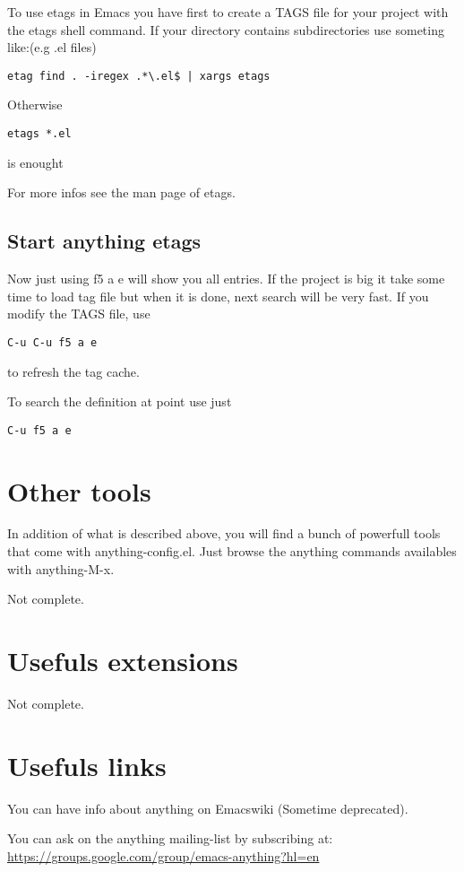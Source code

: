 \documentclass[a4paper,11pt]{article}
\begin{document}
To use etags in Emacs you have first to create a TAGS file for your project with the etags shell command.
If your directory contains subdirectories use someting like:(e.g .el files)
\begin{verbatim}
etag find . -iregex .*\.el$ | xargs etags
\end{verbatim}
Otherwise
\begin{verbatim}
etags *.el
\end{verbatim}
is enought

For more infos see the man page of etags.

\subsection{Start anything etags}
\label{sec:start-anything-etags}


Now just using f5 a e will show you all entries.
If the project is big it take some time to load tag file but when it is done, next search will be very fast.
If you modify the TAGS file, use
\begin{verbatim}
C-u C-u f5 a e
\end{verbatim}
to refresh the tag cache.

To search the definition at point use just
\begin{verbatim}
C-u f5 a e
\end{verbatim}

\section{Other tools}
\label{sec:other-tools}

In addition of what is described above, you will find a bunch of powerfull tools that come with anything-config.el.
Just browse the anything commands availables with anything-M-x.

Not complete.
\section{Usefuls extensions}
\label{sec:usefuls-extensions}
Not complete.

\section{Usefuls links}
\label{sec:usefuls-links}

You can have info about anything on Emacswiki (Sometime deprecated).

You can ask on the anything mailing-list by subscribing at:\\
\url{https://groups.google.com/group/emacs-anything?hl=en}
\end{document}
